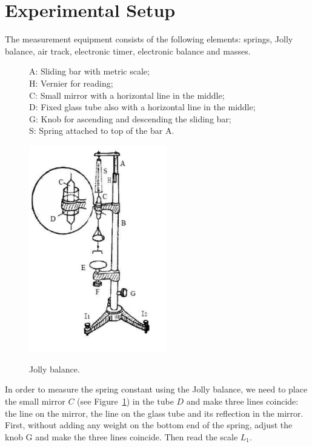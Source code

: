 \section{Experimental Setup}

The measurement equipment consists of the following elements: springs, Jolly
balance, air track, electronic timer, electronic balance and masses.

\begin{figure}[H]
\centering
\begin{minipage}{8cm}
A: Sliding bar with metric scale;\\
H: Vernier for reading;\\
C: Small mirror with a horizontal line in the middle;\\
D: Fixed glass tube also with a horizontal line in the middle;\\
G: Knob for ascending and descending the sliding bar;\\
S: Spring attached to top of the bar A.\\
\end{minipage}
\hspace{0.5cm}
\begin{minipage}{6cm}
\label{jb}
\includegraphics[width=6cm]{fig/ejb}
\end{minipage}
\caption{Jolly balance.}
\end{figure}

In order to measure the spring constant using the Jolly balance, we need to
place the small mirror $C$ (see Figure~\ref{jb}) in the tube $D$ and make
three lines coincide: the line on the mirror, the line on the glass tube and its
reflection in the mirror. First, without adding any weight on the bottom end of
the spring, adjust the knob G and make the three lines coincide. Then read the
scale $L_1$. 
    
